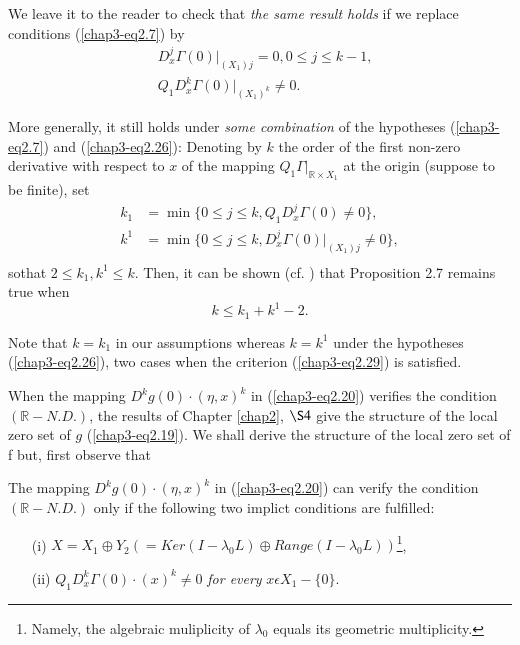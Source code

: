 \begin{remark}\label{chap3-rem2.3}
We leave it to the reader to check that {\em the same result holds} if
we replace conditions (\ref{chap3-eq2.7}) by
\begin{align*}
& D_{x}^{j}\Gamma(0) |_{(X_{1})j} = 0, 0 \leq j \leq k-1,\\
& Q_{1}D_{x}^{k}\Gamma(0) |_{(X_{1})^{k}} \neq 0.\tag{2.26}\label{chap3-eq2.26}
\end{align*}

More generally, it still holds under {\em some combination} of the
hypotheses (\ref{chap3-eq2.7}) and (\ref{chap3-eq2.26}): Denoting by
$k$ the order of the first non-zero derivative with respect to $x$ of the
mapping $Q_{1}\Gamma |_{\mathbb{R} \times X_{1}}$ at the origin
(suppose to be finite), set
\begin{align*}
k_{1} & = \min \{0 \leq j \leq k, Q_{1}D_{x}^{j}\Gamma(0) \neq 0 \},\tag{2.27}\label{chap3-eq2.27}\\
k^{1} & = \min \{0 \leq j \leq k, D_{x}^{j}\Gamma(0) |_{(X_{1})j} \neq
0\},\tag{2.28}\label{chap3-eq2.28}\\
\end{align*}
so\pageoriginale that $2 \leq k_{1}, k^{1} \leq k$. Then, it can be
shown (cf. \cite{31}) that Proposition 2.7 remains true when
\begin{equation*}
k \leq k_{1} + k^{1} - 2.\tag{2.29}\label{chap3-eq2.29}
\end{equation*}

Note that $k = k_{1}$ in our assumptions whereas $k = k^{1}$ under the
hypotheses (\ref{chap3-eq2.26}), two cases when the criterion
(\ref{chap3-eq2.29}) is satisfied.
\end{remark}

When the mapping $D^{k}g(0) \cdot (\eta, x)^{k}$ in
(\ref{chap3-eq2.20}) verifies the condition $(\mathbb{R}-N.D.)$, the
results of Chapter \ref{chap2}, $\S 4$ give the structure of the local
zero set of $g$ (\ref{chap3-eq2.19}). We shall derive the structure of
the local zero set of f but, first observe that

\begin{proposition}\label{chap3-prop2.2}
The mapping $D^{k}g(0) \cdot (\eta, x)^{k}$ in (\ref{chap3-eq2.20})
can verify the condition $(\mathbb{R}-N.D.)$ only if the following two
implict conditions are fulfilled:
\begin{enumerate}
\item[(i)] $X = X_{1} \oplus Y_{2} (= Ker (I - \lambda_{0} L) \oplus
  Range (I - \lambda_{0} L))$\footnote{Namely, the algebraic
    muliplicity of $\lambda_{0}$ equals its geometric multiplicity.},

\item[(ii)] $Q_{1}D_{x}^{k}\Gamma(0) \cdot (x)^{k} \neq 0$ {\em for
  every} $x \epsilon X_{1} - \{0\}$.
\end{enumerate}
\end{proposition}

